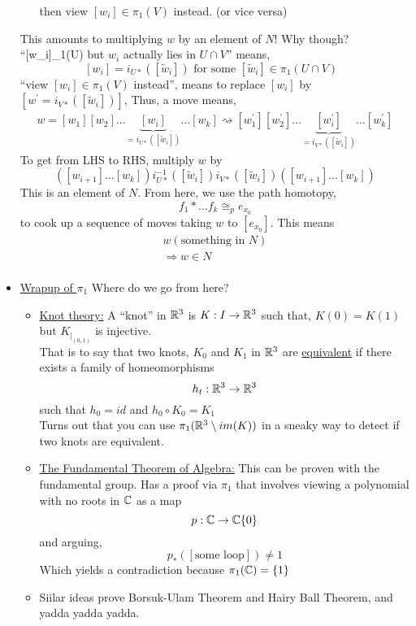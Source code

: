 \documentclass[../notes.tex]{subfiles}
\begin{document}
\begin{itemize}
\begin{itemize}
                then view $[w_i]\in\pi_1(V)$ instead. (or vice versa)
        \end{itemize}
        This amounts to multiplying $w$ by an element of $N$! Why though?
        ``[w_i]\in \pi_1(U) but $w_i$ actually lies in $U\cap V$''
        means,
        \[
            [w_i]=i_{U*}([\tilde{w}_i])\text{ for some $[\tilde{w}_i]\in \pi_1(U\cap V)$ }
        \]
        ``view $[w_i]\in \pi_1(V)$ instead'', means to replace $[w_i]$ by 
        $[w^{\prime}=i_{V*}([\tilde{w}_i])]$, Thus, a move means,
        \begin{align*}
            w=[w_1][w_2]\dots\underbrace{[w_i]}_{=i_{U*}([\tilde{w}_i])}\dots[w_k]\rightsquigarrow 
            [w^{\prime}_1][w^{\prime}_2]\dots\underbrace{[w^{\prime}_i]}_{=i_{V*}([\tilde{w}_i])}\dots[w^{\prime}_k]
        \end{align*}
        To get from LHS to RHS, multiply $w$ by
        \[
            ([w_{i+1}]\dots[w_{k}])i_{U*}^{-1}([\tilde{w}_i])i_{V*}([\tilde{w}_i])([w_{i+1}]\dots[w_k])
        \]
        This is an element of $N$.
        From here, we use the path homotopy,
        \[
            f_1*\dots f_k\cong_{p}e_{x_0}
        \]
        to cook up a sequence of moves taking $w$ to $[e_{x_0}]$. This means
        \begin{align*}
            w(\text{something in $N$})\\
            \Rightarrow w\in N\\
        \end{align*}
    \item \underline{Wrapup of $\pi_1$}
        Where do we go from here?
        \begin{itemize}
            \item \underline{Knot theory:} A ``knot'' in $\mathbb{R}^3$ is $K:I\rightarrow \mathbb{R}^3$ such that,
                $K(0)=K(1)$ but $K_{|_{(0,1)}}$ is injective.\\
                That is to say that two knots, $K_0$ and $K_1$ in $\mathbb{R}^3$ are \underline{equivalent} if there exists a family
                of homeomorphisms
                \[
                    h_t:\mathbb{R}^3\rightarrow \mathbb{R}^3\\
                \]
                such that $h_0=id$ and $h_0\circ K_0=K_1$\\
                Turns out that you can use $\pi_1(\mathbb{R}^3\setminus im(K))$ in a sneaky way to
                detect if two knots are equivalent.
            \item \underline{The Fundamental Theorem of Algebra:} This can be proven with the
                fundamental group. Has a proof via $\pi_1$ that involves viewing a polynomial with no roots in $\mathbb{C}$ as
                a map
                \[
                    p: \mathbb{C} \rightarrow \mathbb{C}\{0\}
                \]
                and arguing,
                \[
                    p_{*}([\text{some loop}])\neq 1
                \]
                Which yields a contradiction because $\pi_1(\mathbb{C})=\{1\}$
            \item Siilar ideas prove Borsuk-Ulam Theorem and Hairy Ball Theorem, and yadda yadda yadda.
        \end{itemize}
    \end{itemize}
\end{document}
